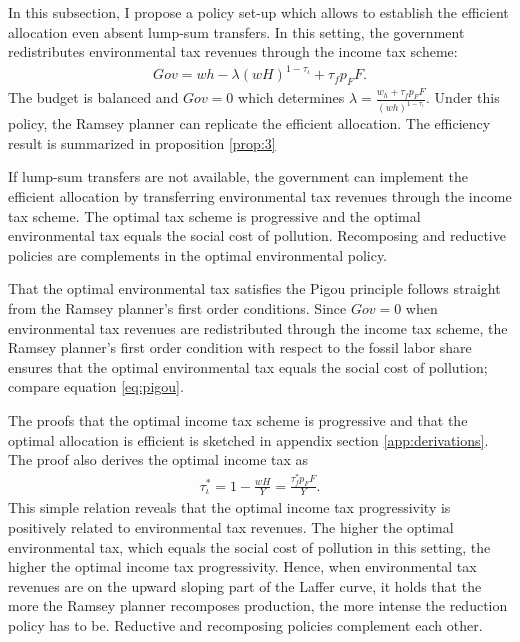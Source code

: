 In this subsection, I propose a policy set-up which allows to establish the efficient allocation even absent lump-sum transfers. In this setting, the government redistributes environmental tax revenues through the income tax scheme:  
\begin{align}
Gov= wh-\lambda (wH)^{1-\tau_\iota}+\tau_f p_FF.
\end{align}
The budget is balanced and $Gov = 0$ which determines $\lambda=\frac{w_h + \tau_f p_F F}{(wh)^{1-\tau_{\iota}}}$. 
Under this policy, the Ramsey planner can replicate the efficient allocation. 
The efficiency result is summarized in proposition \ref{prop:3}

\begin{prop}\label{prop:3}
	If lump-sum transfers are not available, the government can implement the efficient allocation by  transferring environmental tax revenues through the income tax scheme. The optimal tax scheme is progressive and the optimal environmental tax equals the social cost of pollution. Recomposing and reductive policies are complements in the optimal environmental policy.
\end{prop}

	That the optimal environmental tax satisfies the Pigou principle follows straight from the Ramsey planner's first order conditions. Since $Gov=0$ when environmental tax revenues are redistributed through the income tax scheme, the Ramsey planner's first order condition with respect to the fossil labor share ensures that the optimal environmental tax equals the social cost of pollution; compare equation \ref{eq:pigou}. 
	
	The proofs that the optimal income tax scheme is progressive and that the optimal allocation is efficient is sketched in appendix section \ref{app:derivations}. The proof also derives the optimal income tax as
\begin{align}
\tau^*_\iota=1-\frac{wH}{Y}=\frac{\tau_f^*p_FF}{Y}.
\end{align}
This simple relation reveals that the optimal income tax progressivity is positively related to environmental tax revenues.  The higher the optimal environmental tax, which equals the social cost of pollution in this setting, the higher the optimal income tax progressivity. Hence, when environmental tax revenues are on the upward sloping part of the Laffer curve, it holds that  the more the Ramsey planner recomposes production, the more intense the reduction policy has to be. Reductive and recomposing policies complement each other. 
 
